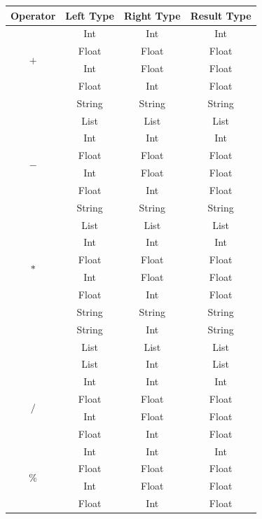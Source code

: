 \documentclass[12pt, titlepage]{article}
\begin{document}
\begin{longtable}{ |c |c |c |c | }
	\hline
	\textbf{Operator} & \textbf{Left Type} & \textbf{Right Type} & \textbf{Result Type} \\ \hline
	\multirow{4}{*}{$+$} & Int & Int & Int \\
	                     & Float & Float & Float \\
	                     & Int & Float & Float \\
	                     & Float & Int & Float \\
	                     & String & String & String \\
	                     & List & List & List \\ \hline
	\multirow{4}{*}{$-$} & Int & Int & Int \\
	                     & Float & Float & Float \\
	                     & Int & Float & Float \\
	                     & Float & Int & Float \\
	                     & String & String & String \\
	                     & List & List & List \\ \hline
	\multirow{4}{*}{$*$} & Int & Int & Int \\
	                     & Float & Float & Float \\
	                     & Int & Float & Float \\
	                     & Float & Int & Float \\
	                     & String & String & String \\
	                     & String & Int & String \\
	                     & List & List & List \\
	                     & List & Int & List \\ \hline
	\multirow{4}{*}{$/$} & Int & Int & Int \\
	                     & Float & Float & Float \\
	                     & Int & Float & Float \\
	                     & Float & Int & Float \\ \hline
	\multirow{4}{*}{$\%$} & Int & Int & Int \\
	                     & Float & Float & Float \\
	                     & Int & Float & Float \\
	                     & Float & Int & Float \\

\end{longtable}
\end{document}

